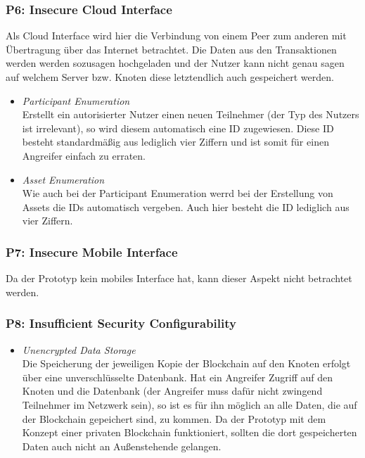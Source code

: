         \subsubsection*{P6: Insecure Cloud Interface}
            Als Cloud Interface wird hier die Verbindung von einem Peer zum anderen mit Übertragung über das Internet betrachtet.
            Die Daten aus den Transaktionen werden werden sozusagen hochgeladen und der Nutzer kann nicht genau sagen auf welchem Server bzw. Knoten diese letztendlich auch gespeichert werden.
            \begin{itemize}[leftmargin=0cm,label={}]
                \item \emph{Participant Enumeration}\label{vuln:prototype_enum_part}\\
                    Erstellt ein autorisierter Nutzer einen neuen Teilnehmer (der Typ des Nutzers ist irrelevant), so wird diesem automatisch eine ID zugewiesen. 
                    Diese ID besteht standardmäßig aus lediglich vier Ziffern und ist somit für einen Angreifer einfach zu erraten.
                \item \emph{Asset Enumeration}\label{vuln:prototype_enum_asset}\\
                    Wie auch bei der Participant Enumeration werrd bei der Erstellung von Assets die IDs automatisch vergeben. 
                    Auch hier besteht die ID lediglich aus vier Ziffern.
            \end{itemize}
            
        \subsubsection*{P7: Insecure Mobile Interface}
            Da der Prototyp kein mobiles Interface hat, kann dieser Aspekt nicht betrachtet werden.
            
        \subsubsection*{P8: Insufficient Security Configurability}
            \begin{itemize}[leftmargin=0cm,label={}]
    	        \item \emph{Unencrypted Data Storage}\label{vuln:prototype_db}\\
                    Die Speicherung der jeweiligen Kopie der Blockchain auf den Knoten erfolgt über eine unverschlüsselte Datenbank. 
                    Hat ein Angreifer Zugriff auf den Knoten und die Datenbank (der Angreifer muss dafür nicht zwingend Teilnehmer im Netzwerk sein), so ist es für ihn möglich an alle Daten, die auf der Blockchain gepeichert sind, zu kommen. 
                    Da der Prototyp mit dem Konzept einer privaten Blockchain funktioniert, sollten die dort gespeicherten Daten auch nicht an Außenstehende gelangen.
            \end{itemize}
            
